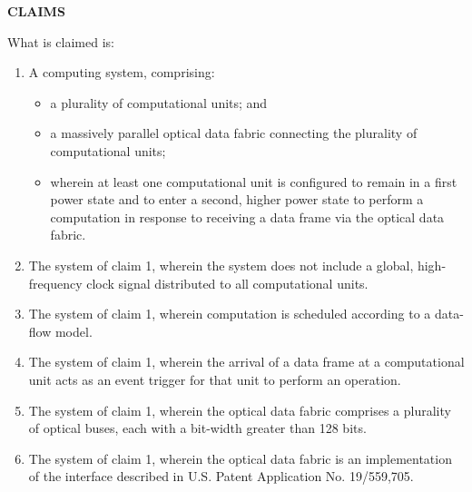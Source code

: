 \documentclass[11pt,letterpaper]{article}
\begin{document}
\thispagestyle{empty}

\begin{center}
    \textbf{\large CLAIMS}
\end{center}

\vspace{0.4cm}
\noindent What is claimed is:

\begin{enumerate}[label=\textbf{\arabic*.}, leftmargin=0.5in, itemsep=0.4cm]
    \item A computing system, comprising:
    \begin{itemize}[leftmargin=0.3in, noitemsep]
        \item a plurality of computational units; and
        \item a massively parallel optical data fabric connecting the plurality of computational units;
        \item wherein at least one computational unit is configured to remain in a first power state and to enter a second, higher power state to perform a computation in response to receiving a data frame via the optical data fabric.
    \end{itemize}

    \item The system of claim 1, wherein the system does not include a global, high-frequency clock signal distributed to all computational units.

    \item The system of claim 1, wherein computation is scheduled according to a data-flow model.

    \item The system of claim 1, wherein the arrival of a data frame at a computational unit acts as an event trigger for that unit to perform an operation.

    \item The system of claim 1, wherein the optical data fabric comprises a plurality of optical buses, each with a bit-width greater than 128 bits.

    \item The system of claim 1, wherein the optical data fabric is an implementation of the interface described in U.S. Patent Application No. 19/559,705.
\end{enumerate}
\end{document}
